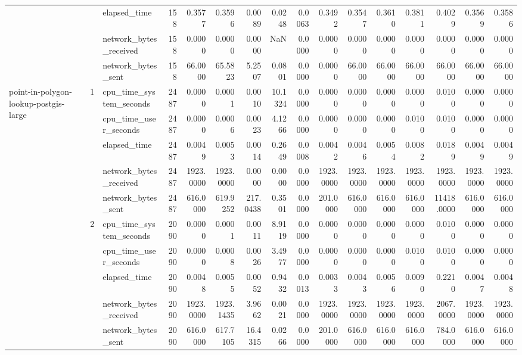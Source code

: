 \begin{tabular}{lllrrrrrrrrrrrrr}
 &  & elapsed\_time & 158 & 0.3577 & 0.3596 & 0.0089 & 0.0248 & 0.0063 & 0.3492 & 0.3547 & 0.3610 & 0.3811 & 0.4029 & 0.3569 & 0.3586 \\
 &  & network\_bytes\_received & 158 & 0.0000 & 0.0000 & 0.0000 & NaN & 0.0000 & 0.0000 & 0.0000 & 0.0000 & 0.0000 & 0.0000 & 0.0000 & 0.0000 \\
 &  & network\_bytes\_sent & 158 & 66.0000 & 65.5823 & 5.2507 & 0.0801 & 0.0000 & 0.0000 & 66.0000 & 66.0000 & 66.0000 & 66.0000 & 66.0000 & 66.0000 \\
\cline{1-16} \cline{2-16}
\multirow[t]{15}{*}{point-in-polygon-lookup-postgis-large} & \multirow[t]{5}{*}{1} & cpu\_time\_system\_seconds & 2487 & 0.0000 & 0.0001 & 0.0010 & 10.1324 & 0.0000 & 0.0000 & 0.0000 & 0.0000 & 0.0000 & 0.0100 & 0.0000 & 0.0000 \\
 &  & cpu\_time\_user\_seconds & 2487 & 0.0000 & 0.0006 & 0.0023 & 4.1266 & 0.0000 & 0.0000 & 0.0000 & 0.0000 & 0.0100 & 0.0100 & 0.0000 & 0.0000 \\
 &  & elapsed\_time & 2487 & 0.0049 & 0.0053 & 0.0014 & 0.2649 & 0.0008 & 0.0042 & 0.0046 & 0.0054 & 0.0082 & 0.0189 & 0.0049 & 0.0049 \\
 &  & network\_bytes\_received & 2487 & 1923.0000 & 1923.0000 & 0.0000 & 0.0000 & 0.0000 & 1923.0000 & 1923.0000 & 1923.0000 & 1923.0000 & 1923.0000 & 1923.0000 & 1923.0000 \\
 &  & network\_bytes\_sent & 2487 & 616.0000 & 619.9252 & 217.0438 & 0.3501 & 0.0000 & 201.0000 & 616.0000 & 616.0000 & 616.0000 & 11418.0000 & 616.0000 & 616.0000 \\
\cline{2-16}
 & \multirow[t]{5}{*}{2} & cpu\_time\_system\_seconds & 2090 & 0.0000 & 0.0001 & 0.0011 & 8.9119 & 0.0000 & 0.0000 & 0.0000 & 0.0000 & 0.0000 & 0.0100 & 0.0000 & 0.0000 \\
 &  & cpu\_time\_user\_seconds & 2090 & 0.0000 & 0.0008 & 0.0026 & 3.4977 & 0.0000 & 0.0000 & 0.0000 & 0.0000 & 0.0100 & 0.0100 & 0.0000 & 0.0000 \\
 &  & elapsed\_time & 2090 & 0.0048 & 0.0055 & 0.0052 & 0.9432 & 0.0013 & 0.0033 & 0.0043 & 0.0056 & 0.0090 & 0.2210 & 0.0047 & 0.0048 \\
 &  & network\_bytes\_received & 2090 & 1923.0000 & 1923.1435 & 3.9662 & 0.0021 & 0.0000 & 1923.0000 & 1923.0000 & 1923.0000 & 1923.0000 & 2067.0000 & 1923.0000 & 1923.0000 \\
 &  & network\_bytes\_sent & 2090 & 616.0000 & 617.7105 & 16.4315 & 0.0266 & 0.0000 & 201.0000 & 616.0000 & 616.0000 & 616.0000 & 784.0000 & 616.0000 & 616.0000 \\

\end{tabular}
